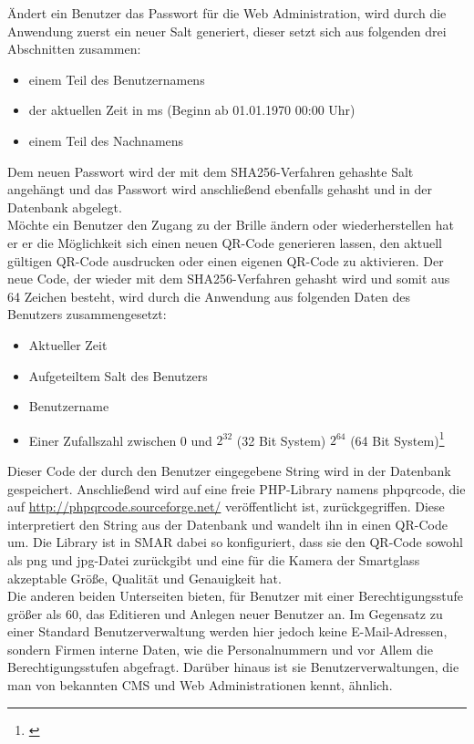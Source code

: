 Ändert ein Benutzer das Passwort für die Web Administration, wird durch die Anwendung zuerst ein neuer Salt generiert, dieser setzt sich aus folgenden drei Abschnitten zusammen:
\begin{itemize}
	\item einem Teil des Benutzernamens
	\item der aktuellen Zeit in ms (Beginn ab 01.01.1970 00:00 Uhr)
	\item einem Teil des Nachnamens
\end{itemize}
Dem neuen Passwort wird der mit dem SHA256-Verfahren gehashte Salt angehängt und das Passwort wird anschließend ebenfalls gehasht und in der Datenbank abgelegt.\\
Möchte ein Benutzer den Zugang zu der Brille ändern oder wiederherstellen hat er er die Möglichkeit sich einen neuen QR-Code generieren lassen, den aktuell gültigen QR-Code ausdrucken oder einen eigenen QR-Code zu aktivieren. Der neue Code, der wieder mit dem SHA256-Verfahren gehasht wird und somit aus 64 Zeichen besteht, wird durch die Anwendung aus folgenden Daten des Benutzers zusammengesetzt:
\begin{itemize}
	\item Aktueller Zeit
	\item Aufgeteiltem Salt des Benutzers
	\item Benutzername
	\item Einer Zufallszahl zwischen 0 und $2^{32}$ (32 Bit System) \bzw $2^{64}$ (64 Bit System)\footnote{{\citep{mt_rand}}}
\end{itemize}
Dieser Code \bzw der durch den Benutzer eingegebene String wird in der Datenbank gespeichert. Anschließend wird auf eine freie PHP-Library namens \glqq phpqrcode\grqq , die auf \url{http://phpqrcode.sourceforge.net/} veröffentlicht ist, zurückgegriffen. Diese interpretiert den String aus der Datenbank und wandelt ihn in einen QR-Code um. Die Library ist in \ac{SMAR} dabei so konfiguriert, dass sie den QR-Code sowohl als png und jpg-Datei zurückgibt und eine für die Kamera der Smartglass akzeptable Größe, Qualität und Genauigkeit hat.\\

Die anderen beiden Unterseiten bieten, für Benutzer mit einer Berechtigungsstufe größer als 60, das Editieren und Anlegen neuer Benutzer an. Im Gegensatz zu einer Standard Benutzerverwaltung werden hier jedoch keine E-Mail-Adressen, sondern Firmen interne Daten, wie \zB die Personalnummern und vor Allem die Berechtigungsstufen abgefragt. Darüber hinaus ist sie Benutzerverwaltungen, die man von bekannten \ac{CMS} und Web Administrationen kennt, ähnlich.